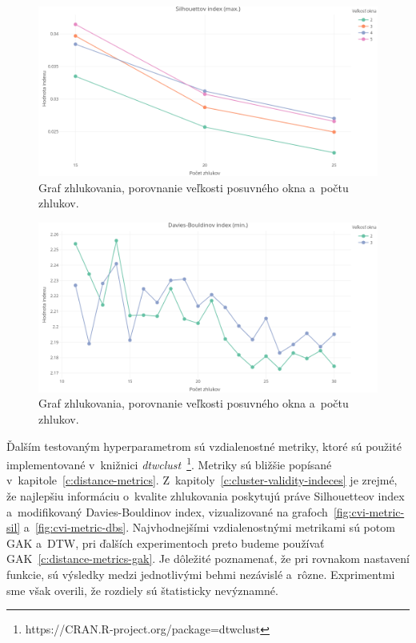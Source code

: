 \documentclass[a4paper,twoside,slovak,12pt,appendix]{article}
\begin{document}
\begin{figure}[htbp]
  \centering
  \includegraphics[width=\textwidth]{cvi/dtw_basic_workdays_sparse/201902271850-Sil-dtw_basic_workdays_sparse.png}
  \caption{Graf zhlukovania, porovnanie veľkosti posuvného okna a~počtu zhlukov.}
	\label{fig:cvi-sparse-sil}
\end{figure}
\begin{figure}[htbp]
  \centering
  \includegraphics[width=\textwidth]{cvi/dtw_basic_workdays_dense/201902271851-DB-dtw_basic_workdays_dense.png}
  \caption{Graf zhlukovania, porovnanie veľkosti posuvného okna a~počtu zhlukov.}
	\label{fig:cvi-dense-db}
\end{figure}

Ďalším testovaným hyperparametrom sú vzdialenostné metriky, ktoré sú použité
implementované v~knižnici
\textit{dtwclust}~\footnote{https://CRAN.R-project.org/package=dtwclust}.
Metriky sú bližšie popísané v~kapitole~\ref{c:distance-metrics}.
Z~kapitoly~\ref{c:cluster-validity-indeces} je zrejmé, že najlepšiu informáciu
o~kvalite zhlukovania poskytujú práve Silhouetteov index
a~modifikovaný Davies-Bouldinov index, vizualizované na
grafoch~\ref{fig:cvi-metric-sil} a~\ref{fig:cvi-metric-dbs}. Najvhodnejšími
vzdialenostnými metrikami sú potom GAK a~DTW, pri ďalších experimentoch preto
budeme používať GAK~\ref{c:distance-metrics-gak}. Je dôležité poznamenať, že
pri rovnakom nastavení funkcie, sú výsledky medzi jednotlivými behmi nezávislé
a~rôzne. Exprimentmi sme však overili, že rozdiely sú štatisticky nevýznamné.
\end{document}
